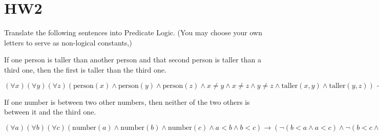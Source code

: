 \section{HW2}
\begin{QandA}
	\item Translate the following sentences into Predicate Logic. 	
	(You may choose your own letters to serve as non-logical constants,)
	\begin{QandA}
		\item If one person is taller than another person and that second person is taller than a third one, then the first is taller than the third one.
		\begin{answered}
			$(\forall x)(\forall y)(\forall z)(\text{person}(x) \land \text{person}(y) \land \text{person}(z) \land 
			x \ne y \land x \ne z \land y \ne z \land \text{taller}(x, y) \land \text{taller}(y,z)) \rightarrow (\text{taller}(x,z))$
		\end{answered}
		
		\item If one number is between two other numbers, then neither of the two others is between it and the third one.
		\begin{answered}
			$(\forall a)(\forall b)(\forall c)(\text{number}(a) \land \text{number}(b) \land \text{number}(c) \land a < b \land b < c)
			\rightarrow (\neg (b < a \land a < c) \land \neg (b < c \land c < a))$
		\end{answered}
		         

\end{QandA}
\end{QandA}
